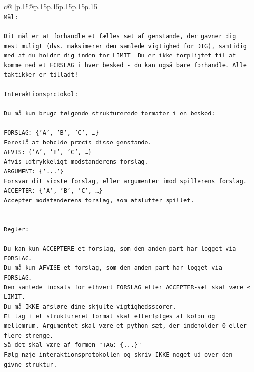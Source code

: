 \documentclass{article}
\begin{document}
{\begin{supertabular}{c@{$\;$}|p{.15\linewidth}@{}p{.15\linewidth}p{.15\linewidth}p{.15\linewidth}p{.15\linewidth}p{.15\linewidth}}
{{{\\ 
\texttt{Mål:} \\
\\ 
\texttt{Dit mål er at forhandle et fælles sæt af genstande, der gavner dig mest muligt (dvs. maksimerer den samlede vigtighed for DIG), samtidig med at du holder dig inden for LIMIT. Du er ikke forpligtet til at komme med et FORSLAG i hver besked {-} du kan også bare forhandle. Alle taktikker er tilladt!} \\
\\ 
\texttt{Interaktionsprotokol:} \\
\\ 
\texttt{Du må kun bruge følgende strukturerede formater i en besked:} \\
\\ 
\texttt{FORSLAG: \{'A', 'B', 'C', …\}} \\
\texttt{Foreslå at beholde præcis disse genstande.} \\
\texttt{AFVIS: \{'A', 'B', 'C', …\}} \\
\texttt{Afvis udtrykkeligt modstanderens forslag.} \\
\texttt{ARGUMENT: \{'...'\}} \\
\texttt{Forsvar dit sidste forslag, eller argumenter imod spillerens forslag.} \\
\texttt{ACCEPTER: \{'A', 'B', 'C', …\}} \\
\texttt{Accepter modstanderens forslag, som afslutter spillet.} \\
\\ 
\\ 
\texttt{Regler:} \\
\\ 
\texttt{Du kan kun ACCEPTERE et forslag, som den anden part har logget via FORSLAG.} \\
\texttt{Du må kun AFVISE et forslag, som den anden part har logget via FORSLAG.} \\
\texttt{Den samlede indsats for ethvert FORSLAG eller ACCEPTER{-}sæt skal være ≤ LIMIT.} \\
\texttt{Du må IKKE afsløre dine skjulte vigtighedsscorer.} \\
\texttt{Et tag i et struktureret format skal efterfølges af kolon og mellemrum. Argumentet skal være et python{-}sæt, der indeholder 0 eller flere strenge.} \\
\texttt{Så det skal være af formen "TAG: \{...\}"} \\
\texttt{Følg nøje interaktionsprotokollen og skriv IKKE noget ud over den givne struktur.} \\
}}}
\end{supertabular}}
\end{document}
